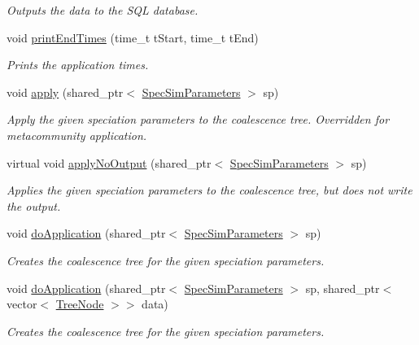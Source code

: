 \begin{DoxyCompactItemize}
\begin{DoxyCompactList}\small\item\em Outputs the data to the S\+QL database. \end{DoxyCompactList}\item 
void \hyperlink{class_community_a36216913433e3e011ee2420e83e1fe4a}{print\+End\+Times} (time\+\_\+t t\+Start, time\+\_\+t t\+End)
\begin{DoxyCompactList}\small\item\em Prints the application times. \end{DoxyCompactList}\item 
void \hyperlink{class_community_a1566ea542f90cb3b1a6bf69e9039ea3f}{apply} (shared\+\_\+ptr$<$ \hyperlink{struct_spec_sim_parameters}{Spec\+Sim\+Parameters} $>$ sp)
\begin{DoxyCompactList}\small\item\em Apply the given speciation parameters to the coalescence tree. Overridden for metacommunity application. \end{DoxyCompactList}\item 
virtual void \hyperlink{class_community_aab4bdf754702d8bcd70bbd3b5b290c58}{apply\+No\+Output} (shared\+\_\+ptr$<$ \hyperlink{struct_spec_sim_parameters}{Spec\+Sim\+Parameters} $>$ sp)
\begin{DoxyCompactList}\small\item\em Applies the given speciation parameters to the coalescence tree, but does not write the output. \end{DoxyCompactList}\item 
void \hyperlink{class_community_a5eb474681b90144d5f21d52f0f2fcb10}{do\+Application} (shared\+\_\+ptr$<$ \hyperlink{struct_spec_sim_parameters}{Spec\+Sim\+Parameters} $>$ sp)
\begin{DoxyCompactList}\small\item\em Creates the coalescence tree for the given speciation parameters. \end{DoxyCompactList}\item 
void \hyperlink{class_community_a76705a3f0f72994463779fc9c59d9e44}{do\+Application} (shared\+\_\+ptr$<$ \hyperlink{struct_spec_sim_parameters}{Spec\+Sim\+Parameters} $>$ sp, shared\+\_\+ptr$<$ vector$<$ \hyperlink{class_tree_node}{Tree\+Node} $>$$>$ data)
\begin{DoxyCompactList}\small\item\em Creates the coalescence tree for the given speciation parameters. \end{DoxyCompactList}\item 
$$
\end{DoxyCompactItemize}
